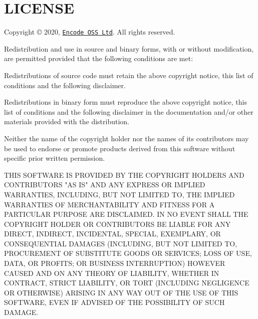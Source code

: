 \chapter{LICENSE }
\hypertarget{md_venv_2lib_2python3_812_2site-packages_2httpcore-1_80_89_8dist-info_2licenses_2LICENSE}{}\label{md_venv_2lib_2python3_812_2site-packages_2httpcore-1_80_89_8dist-info_2licenses_2LICENSE}
Copyright © 2020, \href{https://www.encode.io/}{\texttt{Encode OSS Ltd}}. All rights reserved.

Redistribution and use in source and binary forms, with or without modification, are permitted provided that the following conditions are met:\+


\begin{DoxyItemize}
\item Redistributions of source code must retain the above copyright notice, this list of conditions and the following disclaimer.
\item Redistributions in binary form must reproduce the above copyright notice, this list of conditions and the following disclaimer in the documentation and/\+or other materials provided with the distribution.
\item Neither the name of the copyright holder nor the names of its contributors may be used to endorse or promote products derived from this software without specific prior written permission.
\end{DoxyItemize}

THIS SOFTWARE IS PROVIDED BY THE COPYRIGHT HOLDERS AND CONTRIBUTORS "{}\+AS IS"{} AND ANY EXPRESS OR IMPLIED WARRANTIES, INCLUDING, BUT NOT LIMITED TO, THE IMPLIED WARRANTIES OF MERCHANTABILITY AND FITNESS FOR A PARTICULAR PURPOSE ARE DISCLAIMED. IN NO EVENT SHALL THE COPYRIGHT HOLDER OR CONTRIBUTORS BE LIABLE FOR ANY DIRECT, INDIRECT, INCIDENTAL, SPECIAL, EXEMPLARY, OR CONSEQUENTIAL DAMAGES (INCLUDING, BUT NOT LIMITED TO, PROCUREMENT OF SUBSTITUTE GOODS OR SERVICES; LOSS OF USE, DATA, OR PROFITS; OR BUSINESS INTERRUPTION) HOWEVER CAUSED AND ON ANY THEORY OF LIABILITY, WHETHER IN CONTRACT, STRICT LIABILITY, OR TORT (INCLUDING NEGLIGENCE OR OTHERWISE) ARISING IN ANY WAY OUT OF THE USE OF THIS SOFTWARE, EVEN IF ADVISED OF THE POSSIBILITY OF SUCH DAMAGE. 